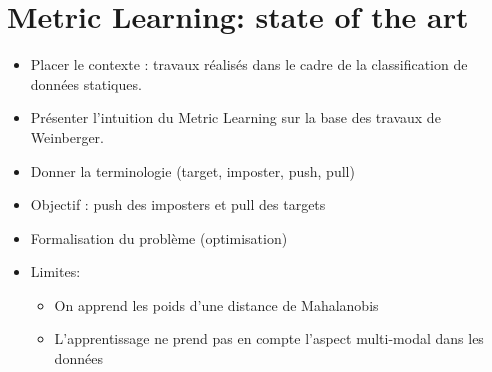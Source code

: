 \section{Metric Learning: state of the art}
\begin{itemize}
	\item Placer le contexte : travaux réalisés dans le cadre de la classification de données statiques.
	\item Présenter l'intuition du Metric Learning sur la base des travaux de Weinberger.
	\item Donner la terminologie (target, imposter, push, pull)
	\item Objectif : push des imposters et pull des targets
	\item Formalisation du problème (optimisation)
	\item Limites:
	\begin{itemize}
		\item On apprend les poids d'une distance de Mahalanobis
		\item L'apprentissage ne prend pas en compte l'aspect multi-modal dans les données
	\end{itemize}
\end{itemize}

